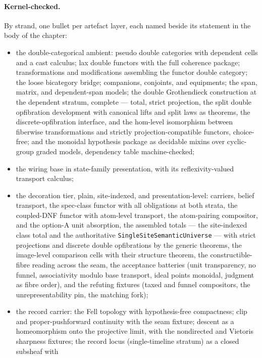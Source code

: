 \paragraph{Kernel-checked.} By strand, one bullet per artefact
layer, each named beside its statement in the body of the chapter:
\begin{itemize}
\item the double-categorical ambient: pseudo double categories with
  dependent cells and a cast calculus; lax double functors with the
  full coherence package; transformations and modifications
  assembling the functor double category; the loose bicategory
  bridge; companions, conjoints, and equipments; the span, matrix,
  and dependent-span models; the double Grothendieck construction
  at the dependent stratum, complete --- total, strict projection,
  the split double opfibration development with canonical lifts and
  split laws as theorems, the discrete-opfibration interface, and
  the hom-level isomorphism between fiberwise transformations and
  strictly projection-compatible functors, choice-free; and the
  monoidal hypothesis package as decidable mixins over cyclic-group
  graded models, dependency table machine-checked;
\item the wiring base in state-family presentation, with its
  reflexivity-valued transport calculus;
\item the decoration tier, plain, site-indexed, and
  presentation-level: carriers,
  belief transport, the spec-class functor with all obligations at
  both strata, the coupled-DNF functor with atom-level transport,
  the atom-pairing compositor, and the option-A unit absorption,
  the assembled totals --- the site-indexed class total and the
  authoritative \texttt{SingleSiteSemanticUniverse} --- with strict
  projections and
  discrete double opfibrations by the generic theorems, the
  image-level comparison cells with their structure theorem, the
  constructible-fibre reading across the seam, the
  acceptance batteries (unit transparency, no funnel, associativity
  modulo base transport, ideal points monoidal, judgment as fibre
  order), and the refuting fixtures (taxed and funnel compositors,
  the unrepresentability pin, the matching fork);
\item the record carrier: the Fell topology with hypothesis-free
  compactness; clip and proper-pushforward continuity with the
  seam fixture; descent as a homeomorphism onto the projective
  limit, with the nondirected and Vietoris sharpness fixtures; the
  record locus (single-timeline stratum) as a closed subsheaf with

\end{itemize}
